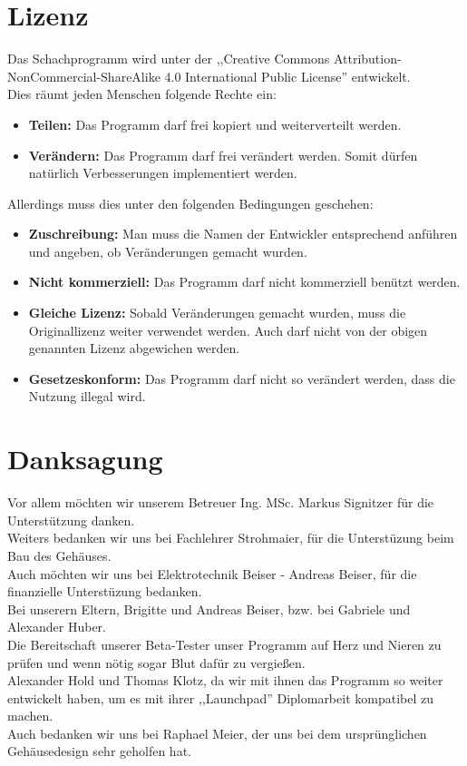 \documentclass[12pt,a4paper]{article}
\begin{document}
{%
\clearpage\vfill\newpage{}
\renewcommand\thesection{ii}
\section{Lizenz}
\label{SEC:licence}

Das Schachprogramm wird unter der ,,Creative Commons Attribution-NonCommercial-ShareAlike 4.0 International Public License'' entwickelt. \\
Dies räumt jeden Menschen folgende Rechte ein: 
\begin{itemize}
	\item{\textbf{Teilen:} Das Programm darf frei kopiert und weiterverteilt werden.}
	\item{\textbf{Verändern:} Das Programm darf frei verändert werden. Somit dürfen natürlich Verbesserungen implementiert werden.}
\end{itemize}

Allerdings muss dies unter den folgenden Bedingungen geschehen:
\begin{itemize}
	\item{\textbf{Zuschreibung:} Man muss die Namen der Entwickler entsprechend anführen und angeben, ob Veränderungen gemacht wurden.}
	\item{\textbf{Nicht kommerziell:} Das Programm darf nicht kommerziell benützt werden.}
	\item{\textbf{Gleiche Lizenz:} Sobald Veränderungen gemacht wurden, muss die Originallizenz weiter verwendet werden. Auch darf nicht von der obigen genannten Lizenz abgewichen werden.}
	\item{\textbf{Gesetzeskonform:} Das Programm darf nicht so verändert werden, dass die Nutzung illegal wird.}
\end{itemize}

\newpage
\renewcommand\thesection{iii}
\section{Danksagung}
\label{SEC:THANKS}

Vor allem möchten wir unserem Betreuer Ing. MSc. Markus Signitzer für die Unterstützung danken. \\
Weiters bedanken wir uns bei Fachlehrer Strohmaier, für die Unterstüzung beim Bau des Gehäuses. \\[1ex]
Auch möchten wir uns bei Elektrotechnik Beiser - Andreas Beiser, für die finanzielle Unterstüzung bedanken. \\[1ex]
Bei unserern Eltern, Brigitte und Andreas Beiser, bzw. bei Gabriele und Alexander Huber. \\
Die Bereitschaft unserer Beta-Tester unser Programm auf Herz und Nieren zu prüfen und wenn nötig sogar Blut dafür zu vergießen.\\
Alexander Hold und Thomas Klotz, da wir mit ihnen das Programm so weiter entwickelt haben, um es mit ihrer ,,Launchpad'' Diplomarbeit kompatibel zu machen. \\
Auch bedanken wir uns bei Raphael Meier, der uns bei dem ursprünglichen Gehäusedesign sehr geholfen hat.

}
\end{document}
